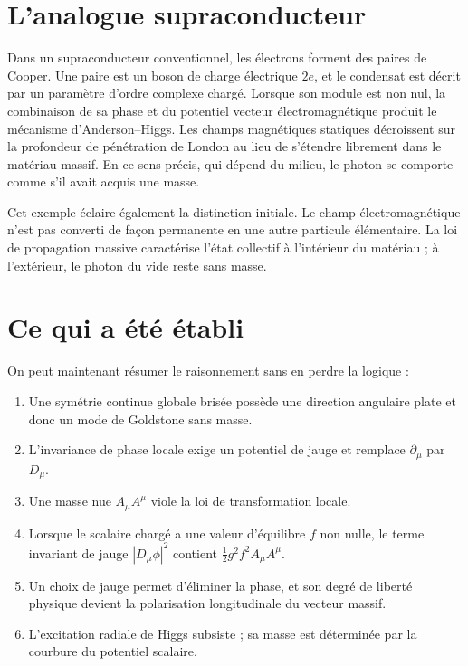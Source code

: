 \section{L’analogue supraconducteur}

Dans un supraconducteur conventionnel, les électrons forment des paires de Cooper. Une paire est un boson de charge électrique \(2e\), et le condensat est décrit par un paramètre d’ordre complexe chargé. Lorsque son module est non nul, la combinaison de sa phase et du potentiel vecteur électromagnétique produit le mécanisme d’Anderson--Higgs. Les champs magnétiques statiques décroissent sur la profondeur de pénétration de London au lieu de s’étendre librement dans le matériau massif. En ce sens précis, qui dépend du milieu, le photon se comporte comme s’il avait acquis une masse.

Cet exemple éclaire également la distinction initiale. Le champ électromagnétique n’est pas converti de façon permanente en une autre particule élémentaire. La loi de propagation massive caractérise l’état collectif à l’intérieur du matériau ; à l’extérieur, le photon du vide reste sans masse.

\section{Ce qui a été établi}

On peut maintenant résumer le raisonnement sans en perdre la logique :
\begin{enumerate}
  \item Une symétrie continue globale brisée possède une direction angulaire plate et donc un mode de Goldstone sans masse.
  \item L’invariance de phase locale exige un potentiel de jauge et remplace \(\partial_\mu\) par \(D_\mu\).
  \item Une masse nue \(A_\mu A^\mu\) viole la loi de transformation locale.
  \item Lorsque le scalaire chargé a une valeur d’équilibre \(f\) non nulle, le terme invariant de jauge \(|D_\mu\phi|^2\) contient \(\frac12g^2f^2A_\mu A^\mu\).
  \item Un choix de jauge permet d’éliminer la phase, et son degré de liberté physique devient la polarisation longitudinale du vecteur massif.
  \item L’excitation radiale de Higgs subsiste ; sa masse est déterminée par la courbure du potentiel scalaire.
\end{enumerate}

